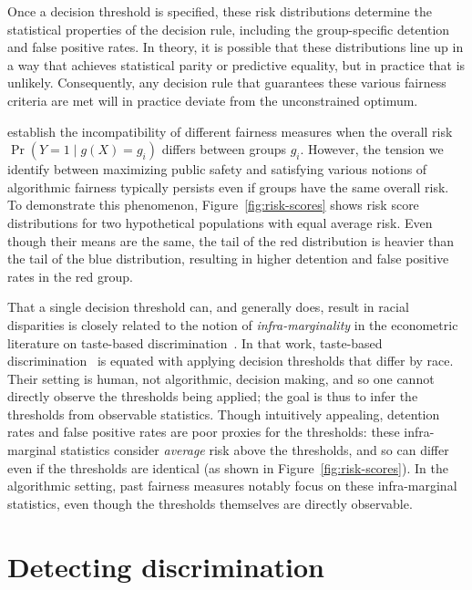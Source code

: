 \documentclass[sigconf]{acmart}
\begin{document}
Once a decision threshold is specified, these risk distributions determine the statistical properties of the decision rule,
including the group-specific detention and false positive rates.
In theory, it is possible that these distributions line up in a way that achieves statistical parity or predictive equality,
but in practice that is unlikely.
Consequently, any decision rule that guarantees these various fairness criteria are met will in practice deviate from the unconstrained optimum.

\citet{kleinberg2016inherent} establish the incompatibility of different fairness measures when the overall risk $\Pr(Y=1 \mid g(X) = g_i)$ differs between groups $g_i$. However, the tension we identify between maximizing public safety 
and satisfying various notions of algorithmic fairness
typically persists even if groups have the same overall risk. 
To demonstrate this phenomenon, Figure~\ref{fig:risk-scores} shows 
risk score distributions for two hypothetical populations with equal average risk. 
Even though their means are the same, the tail of the red distribution is heavier than the tail of the blue distribution,
resulting in higher detention and false positive rates in the red group.

That a single decision threshold can, and generally does, result in racial disparities is closely related to the 
notion of \emph{infra-marginality} in the econometric literature on taste-based discrimination~\cite{ayres2002outcome,simoiu2017,anwar2006,pierson2017}.
In that work, taste-based discrimination~\cite{becker1957}
is equated with applying decision thresholds that differ by race.
Their setting is human, not algorithmic, decision making, and so one cannot directly observe the thresholds being applied;
the goal is thus to infer the thresholds from observable statistics.
Though intuitively appealing, 
detention rates and false positive rates are poor proxies for the thresholds:
these infra-marginal statistics consider \emph{average} risk above the thresholds, and so can differ even if the thresholds are identical (as shown in Figure~\ref{fig:risk-scores}). 
In the algorithmic setting, past fairness measures notably focus on these infra-marginal statistics, even though the thresholds themselves are directly observable.

\section{Detecting discrimination}
\label{sec:calibration}
\end{document}
